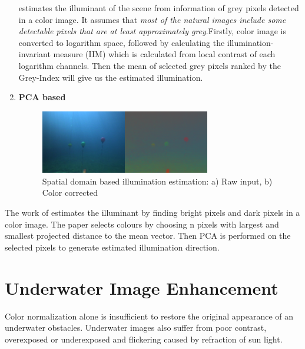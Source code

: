\documentclass[hyp]{socreport}
\begin{document}
\begin{enumerate}
 estimates the illuminant of the scene from
information of grey pixels detected in a color image. It assumes that
\textit{most of the natural images include some detectable pixels that are at
  least approximately grey}.Firstly, color image is converted to logarithm
space, followed by calculating the illumination-invariant measure (IIM) which is
calculated from local contrast of each logarithm channels. Then the mean of
selected grey pixels ranked by the Grey-Index will give us the estimated illumination.

\item \textbf{PCA based} \\

\begin{figure}[H]
\centering
  \includegraphics[width=0.7\textwidth, height=0.2\textheight]{spatialcolorconstancy.png}
  \caption{Spatial domain based illumination estimation: a) Raw input, b)
    Color corrected}
  \label{fig:spatial_colorconstancy}
\end{figure}
\end{enumerate}

The work of  estimates the illuminant by finding
bright pixels and dark pixels in a color image. The paper selects colours by
choosing n pixels with largest and smallest projected distance to the mean
vector. Then PCA is performed on the selected pixels to generate estimated
illumination direction.

\section{Underwater Image Enhancement}

Color normalization alone is insufficient to restore the original appearance of
an underwater obstacles. Underwater images also suffer from poor contrast,
overexposed or underexposed and flickering caused by refraction of sun light.
\end{document}
